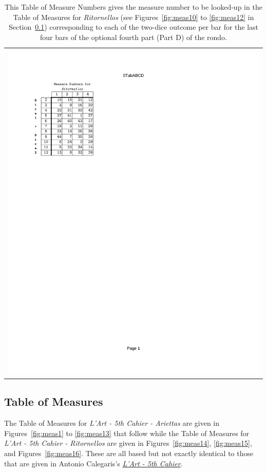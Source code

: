 \documentclass[a4paper,x11names,svgnames,10pt]{article}
\begin{document}
{\begin{table}[H]
	\centering
	\begin{tabular}{c}
		\centering
		\includegraphics[clip=true,trim=0.75in 7.30in 5.25in 1.00in,scale=0.90]{0TAB-R}
	\end{tabular}
	\caption{This Table of Measure Numbers gives the measure number to be looked-up in the Table of Measures for {\it Ritornellos} (see Figures~\ref{fig:meas10} to \ref{fig:meas12} in Section~\ref{tabMeas}) corresponding to each of the two-dice outcome per bar for the last four bars of the optional fourth part (Part D) of the rondo.}
	\label{tab:find4}
\end{table}


\subsection{Table of Measures}\label{tabMeas}

The Table of Measures for {\em L'Art - 5th Cahier - Ariettas} are given in Figures~\ref{fig:meas1} to \ref{fig:meas13} that follow while the  Table of Measures for {\em L'Art - 5th Cahier - Ritornellos} are given in Figures~\ref{fig:meas14}, \ref{fig:meas15}, and Figures~\ref{fig:meas16}.  These are all based but not exactly identical to those that are given in Antonio Calegaris's \href{https://imslp.org/wiki/L'art\_de_composer\_de\_la_musique\_sans\_en\_conna\%C3\%AEtre\_les\_\%C3\%A9l\%C3\%A9ments\_(Calegari\%2C\_Antonio)}{{\em L'Art - 5th Cahier}}.

}
\end{document}
